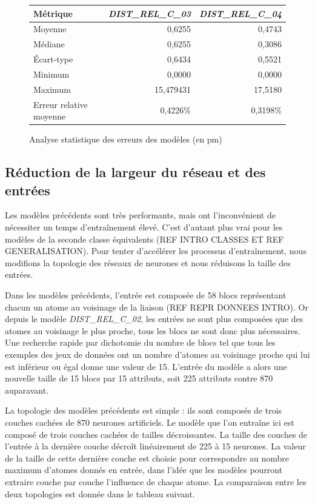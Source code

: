 \begin{figure}[!h]
	\centering
	\begin{tabular}{|l|r|r|}
		\hline
		\textbf{Métrique}& \textbf{\emph{DIST\_REL\_C\_03}} & \textbf{\emph{DIST\_REL\_C\_04}} \\ \hline
		Moyenne & 0,6255 & 0,4743\\ \hline
		Médiane & 0,6255 & 0,3086 \\ \hline
		Écart-type & 0,6434 & 0,5521 \\ \hline
		Minimum & 0,0000 & 0,0000\\ \hline
		Maximum & 15,479431 & 17,5180\\ \hline
		Erreur relative moyenne & 0,4226\% & 0,3198\%\\ \hline
	\end{tabular}
	
	\caption{Analyse statistique des erreurs des modèles (en pm)}
\end{figure}

\subsection{Réduction de la largeur du réseau et des entrées}
\par Les modèles précédents sont très performants, mais ont l'inconvénient de nécessiter un temps d'entraînement élevé. C'est d'autant plus vrai pour les modèles de la seconde classe équivalents (REF INTRO CLASSES ET REF GENERALISATION). Pour tenter d'accélérer les processus d'entraînement, nous modifions la topologie des réseaux de neurones et nous réduisons la taille des entrées.
\par Dans les modèles précédents, l'entrée est composée de 58 blocs représentant chacun un atome au voisinage de la liaison (REF REPR DONNEES INTRO). Or depuis le modèle \emph{DIST\_REL\_C\_02}, les entrées ne sont plus composées que des atomes au voisinage le plus proche, tous les blocs ne sont donc plus nécessaires. Une recherche rapide par dichotomie du nombre de blocs tel que tous les exemples des jeux de données ont un nombre d'atomes au voisinage proche qui lui est inférieur ou égal donne une valeur de 15. L'entrée du modèle a alors une nouvelle taille de 15 blocs par 15 attributs, soit 225 attributs contre 870 auparavant.
\par La topologie des modèles précédents est simple : ils sont composés de trois couches cachées de 870 neurones artificiels. Le modèle que l'on entraîne ici est composé de trois couches cachées de tailles décroissantes. La taille des couches de l'entrée à la dernière couche décroît linéairement de 225 à 15 neurones. La valeur de la taille de cette dernière couche est choisie pour correspondre au nombre maximum d'atomes donnés en entrée, dans l'idée que les modèles pourront extraire couche par couche l'influence de chaque atome. La comparaison entre les deux topologies est donnée dans le tableau suivant.

